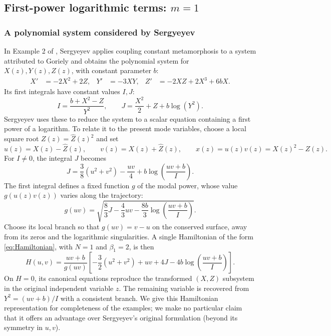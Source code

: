 \documentclass[11pt,a4paper]{article}
\numberwithin{equation}{section}
\begin{document}
\subsection{First-power logarithmic terms: \texorpdfstring{$m=1$}{m=1}}
\label{sec:log-linear-examples}

\subsubsection{A polynomial system considered by Sergyeyev}
\label{sec:sergyeyev-log-example}

In Example 2 of \cite{sergyeyevCouplingConstantMetamorphosis2012}, Sergyeyev applies coupling constant metamorphosis to a system attributed to Goriely and obtains the polynomial system for $X(z),Y(z),Z(z)$, with constant parameter $b$:
\begin{align}
    X'&=-2X^2+2Z, & Y'&=-3XY, & Z'&=-2XZ+2X^3+6bX.
    \label{eq:sergyeyev-polynomial}
\end{align}
Its first integrals have constant values $I,J$:
\begin{equation}
    I=\frac{b+X^2-Z}{Y^2},\qquad
    J=\frac{X^2}{2}+Z+b\log(Y^2).
    \label{eq:sergyeyev-integrals}
\end{equation}
Sergyeyev uses these to reduce the system to a scalar equation containing a first power of a logarithm. To relate it to the present mode variables, choose a local square root $Z(z)=\widehat Z(z)^2$ and set
\begin{equation}
    u(z)=X(z)-\widehat Z(z),\qquad v(z)=X(z)+\widehat Z(z),\qquad
    x(z)=u(z)v(z)=X(z)^2-Z(z).
\end{equation}
For $I\ne0$, the integral $J$ becomes
\begin{equation}
    J=\frac38(u^2+v^2)-\frac{uv}{4}
      +b\log\left(\frac{uv+b}{I}\right).
\end{equation}
The first integral defines a fixed function $g$ of the modal power, whose value $g(u(z)v(z))$ varies along the trajectory:
\begin{equation}
    g(uv)=\sqrt{\frac83J-\frac43uv-\frac{8b}{3}
       \log\left(\frac{uv+b}{I}\right)}.
    \label{eq:sergyeyev-power-prefactor}
\end{equation}
Choose its local branch so that $g(uv)=v-u$ on the conserved surface, away from its zeros and the logarithmic singularities. A single Hamiltonian of the form \eqref{eq:Hamiltonian}, with $N=1$ and $\beta_1=2$, is then
\begin{equation}
    H(u,v)=\frac{uv+b}{g(uv)}\left[
       -\frac32(u^2+v^2)+uv+4J
       -4b\log\left(\frac{uv+b}{I}\right)
    \right].
    \label{eq:sergyeyev-power-hamiltonian}
\end{equation}
On $H=0$, its canonical equations reproduce the transformed $(X,Z)$ subsystem in the original independent variable $z$. The remaining variable is recovered from $Y^2=(uv+b)/I$ with a consistent branch. We give this Hamiltonian representation for completeness of the examples; we make no particular claim that it offers an advantage over Sergyeyev's original formulation (beyond its symmetry in $u,v$).
\end{document}
